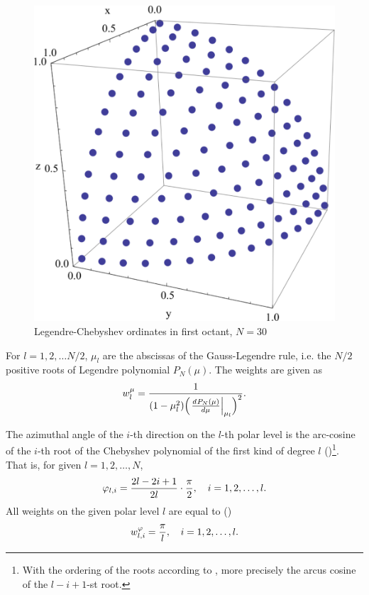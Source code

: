 \begin{figure}[!h]
  \centering
  \includegraphics[scale=.265]{ordinates}
  \caption[Discrete ordinates in the first octant]{Legendre-Chebyshev
  ordinates in first octant, $N=30$}
\end{figure}

For $l = 1,2,\ldots
N/2$, $\mu_l$ are the abscissas of the Gauss-Legendre rule, i.e. the $N/2$ positive roots of Legendre polynomial
$P_N(\mu)$. The weights are given as
$$
	w_{l}^\mu = \frac{1}{(1-\mu_l^2)\Bigl(\left.\frac{{d}^{}{P_N(\mu)}}{{d} {\mu}^{}}\right\vert_{\mu_l}\Bigr)^2}.
$$

The azimuthal angle of the $i$-th direction on the $l$-th polar level is the arc-cosine of the
$i$-th root of the Chebyshev polynomial of the first kind of degree $l$ (\cite[p.402]{weissteinCRC})\footnote{With the
ordering of the roots according to \cite{weissteinCRC}, more precisely the arcus cosine of the $l-i+1$-st root.}. That
is, for given $l = 1,2,\ldots,N$, 
$$
	\varphi_{l,i} = \frac{2l-2i+1}{2l}\cdot\frac{\pi}{2},\quad i = 1,2,\ldots, l.
$$
All weights on the given polar level $l$ are equal to (\cite[p.402]{weissteinCRC})
$$
	w_{l,i}^\varphi = \frac{\pi}{l},\quad i = 1,2,\ldots, l.
$$


